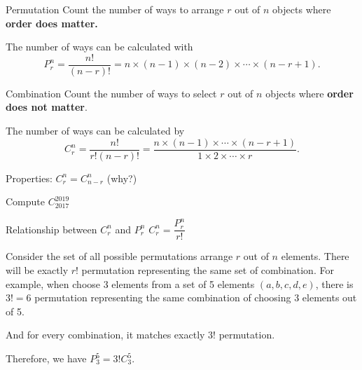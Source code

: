 
\begin{mysubsection}{}
    \begin{definition}[def:]{Permutation}
        Count the number of ways to arrange $r$ out of $n$ objects where \textbf{order does matter.}

        The number of ways can be calculated with
        \begin{equation*}
            P^n_r=\dfrac{n!}{(n-r)!}=n\times (n-1)\times (n-2)\times \cdots\times (n-r+1).
        \end{equation*}
    \end{definition}
    \myframebreak

    \begin{definition}[def:]{Combination}
        Count the number of ways to select $r$  out of $n$ objects where \textbf{order does not matter}.

        The number of ways can be calculated by
        \begin{equation*}
            C^n_r=\dfrac{n!}{r!(n-r)!}=\dfrac{n\times (n-1)\times  \cdots\times (n-r+1)}{1\times 2\times \cdots\times r}.
        \end{equation*}
    \end{definition}

    Properties: $C^n_r = C^n_{n-r}$ (why?)

    Compute $C^{2019}_{2017}$
\end{mysubsection}

\begin{mysubsection}{Relationship between \texorpdfstring{$C^n_r$ and $P^n_r$}{ncr and npr}}
    $C^n_r = \dfrac{P^n_r}{r!}$


    Consider the set of all possible permutations arrange $r$ out of $n$ elements. There will be exactly $r!$ permutation representing the same set of combination.
    For example, when choose 3 elements from a set of 5 elements $(a,b,c,d,e)$, there is $3!=6$ permutation representing the same combination of choosing 3 elements out of 5.

    And for every combination, it matches exactly $3!$ permutation.

    Therefore, we have $P^5_3 = 3!C^5_3$.
\end{mysubsection}

